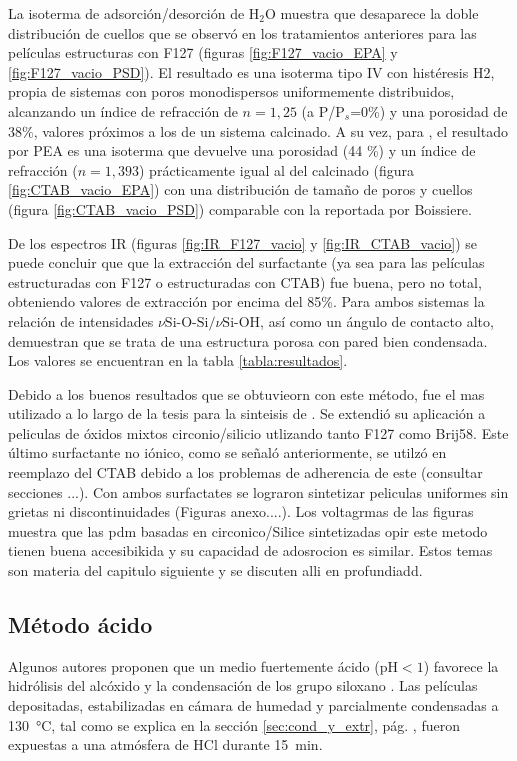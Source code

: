 		 La isoterma de adsorción/desorción de H$_2$O muestra que desaparece la doble distribución de cuellos que se observó en los tratamientos anteriores para las películas estructuras con F127 (figuras \ref{fig:F127_vacio_EPA} y \ref{fig:F127_vacio_PSD}). El resultado es una isoterma tipo IV con histéresis H2, propia de sistemas con poros monodispersos uniformemente distribuidos, alcanzando un índice de refracción de $n=1,25$ (a P/P$_s$=0\%) y una porosidad de $38\%$, valores próximos a los de un sistema calcinado. A su vez, para \pdmC, el resultado por PEA es una isoterma que devuelve una porosidad (44 \%) y un índice de refracción ($n=1,393$) prácticamente igual al del calcinado (figura \ref{fig:CTAB_vacio_EPA}) con una distribución de tamaño de poros y cuellos (figura \ref{fig:CTAB_vacio_PSD}) comparable con la reportada por Boissiere\cite{Boissiere2005}.

		 De los espectros IR  (figuras \ref{fig:IR_F127_vacio} y \ref{fig:IR_CTAB_vacio}) se puede concluir que que la extracción del surfactante (ya sea para las películas estructuradas con F127 o estructuradas con CTAB) fue buena, pero no total, obteniendo valores de extracción por encima del 85\%. Para ambos sistemas la relación de intensidades $\nu{\text{Si-O-Si/}}\nu{\text{Si-OH}}$, así como un ángulo de contacto alto, demuestran que se trata de una estructura porosa con pared bien condensada. Los valores se encuentran en la tabla \ref{tabla:resultados}.

		 Debido a los buenos resultados que se obtuvieorn con este método, fue el mas utilizado a lo largo de la tesis para la sinteisis de \pdm. Se extendió su aplicación a peliculas de óxidos mixtos circonio/silicio utlizando tanto F127 como Brij58. Este último surfactante no iónico, como se señaló anteriormente, se utilzó en reemplazo del CTAB debido a los problemas de adherencia de este (consultar secciones ...). Con ambos surfactates se lograron sintetizar peliculas uniformes sin grietas ni discontinuidades (Figuras anexo....). Los voltagrmas de las figuras muestra que las pdm basadas en circonico/Silice sintetizadas opir este metodo tienen buena accesibikida y su capacidad de adosrocion es similar. Estos temas son materia del capitulo siguiente y se discuten alli en profundiadd.

	 \subsection{Método ácido}

	 	 Algunos autores proponen que un medio fuertemente ácido (pH$<1$) favorece la hidrólisis del alcóxido y la condensación de los grupo siloxano \cite{Soler-Illia2011,Doshi2000a,Huo1996,Boissiere2000,Beck1992}. Las películas depositadas, estabilizadas en cámara de humedad y  parcialmente condensadas a \SI{130}{\celsius}, tal como se explica en la sección \ref{sec:cond_y_extr}, pág. \pageref{sec:cond_y_extr}, fueron expuestas a una atmósfera de HCl durante \SI{15}{\minute}. 

